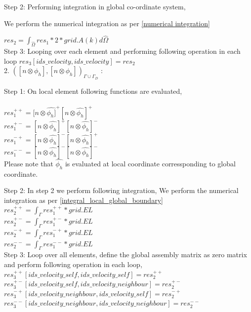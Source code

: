 \documentclass[a4paper,12pt]{book}
\begin{document}
Step 2: Performing integration in global co-ordinate system,

We perform the numerical integration as per \ref{numerical integration} 

$res_2 = \int_{\hat{\Omega}} res_1 *2*grid.A(k)  d \hat{\Omega}$\\

Step 3: Looping over each element and performing following operation in each loop $res_3[ids\_velocity,ids\_velocity]=res_2$\\


2. $([n \otimes \phi_h], [n \otimes \phi_h])_{\Gamma \cup \Gamma_D}$ :

Step 1: On local element following functions are evaluated,\\
\\
$res_1^{++} = [n \otimes \hat{\phi_h]}^+ [n \otimes \hat{\phi_h}]^+$\\
$res_1^{+-} = [n \otimes \hat{\phi_h}]^+ [n \otimes \hat{\phi_h}]^-$\\
$res_1^{-+} = [n \otimes \hat{\phi_h}]^- [n \otimes \hat{\phi_h}]^+$\\
$res_1^{--} = [n \otimes \hat{\phi_h}]^- [n \otimes \hat{\phi_h}]^-$\\

Please note that $\hat{\phi_h}$ is evaluated at local coordinate corressponding to global coordinate.

Step 2: In step 2 we perform following integration, 
We perform the numerical integration as per \ref{integral_local_global_boundary}
\\ 
$res_2^{++} = \int_{\Gamma} res_1^{++} * grid.EL$\\
$res_2^{+-} = \int_{\Gamma} res_1^{+-} * grid.EL$\\
$res_2^{-+} = \int_{\Gamma} res_1^{-+} * grid.EL$\\
$res_2^{--} = \int_{\Gamma} res_1^{--} * grid.EL$\\

Step 3: Loop over all elements, define the global assembly matrix as zero matrix and perform following operation in each loop,
\\
$res_3^{++}[ids\_velocity\_self,ids\_velocity\_self] = res_2^{++}$\\
$res_3^{+-}[ids\_velocity\_self,ids\_velocity\_neighbour] = res_2^{+-}$\\
$res_3^{-+}[ids\_velocity\_neighbour,ids\_velocity\_self] = res_2^{-+}$\\
$res_3^{--}[ids\_velocity\_neighbour,ids\_velocity\_neighbour] = res_2^{--}$\\
\end{document}
